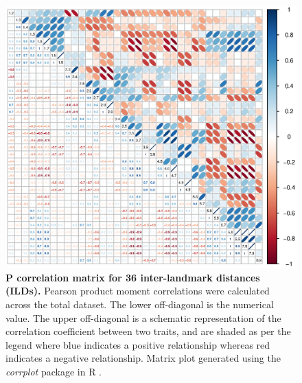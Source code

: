 \begin{figure}[htp]
\includegraphics[width=1\textwidth]{Supp/Additional_Info/CorMAt_36_ILDs.eps}
\vspace{-1cm}
\caption[P correlation matrix for 36 inter-landmark distances (ILDs).]
{\textbf{P correlation matrix for 36 inter-landmark distances (ILDs).} Pearson product moment correlations were calculated across the total dataset. The lower off-diagonal is the numerical value. The upper off-diagonal is a schematic representation of the correlation coefficient between two traits, and are shaded as per the legend where blue indicates a positive relationship whereas red indicates a negative relationship. Matrix plot generated using the \textit{corrplot} package in R \citep{corrplot2017}.}
\label{fig:CorMAt_36_ILDs}
\end{figure}
\FloatBarrier
\newpage



